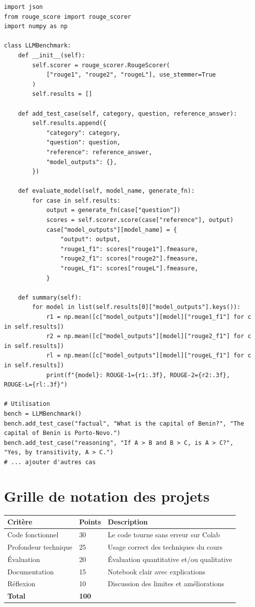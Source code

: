 \begin{verbatim}
import json
from rouge_score import rouge_scorer
import numpy as np

class LLMBenchmark:
    def __init__(self):
        self.scorer = rouge_scorer.RougeScorer(
            ["rouge1", "rouge2", "rougeL"], use_stemmer=True
        )
        self.results = []

    def add_test_case(self, category, question, reference_answer):
        self.results.append({
            "category": category,
            "question": question,
            "reference": reference_answer,
            "model_outputs": {},
        })

    def evaluate_model(self, model_name, generate_fn):
        for case in self.results:
            output = generate_fn(case["question"])
            scores = self.scorer.score(case["reference"], output)
            case["model_outputs"][model_name] = {
                "output": output,
                "rouge1_f1": scores["rouge1"].fmeasure,
                "rouge2_f1": scores["rouge2"].fmeasure,
                "rougeL_f1": scores["rougeL"].fmeasure,
            }

    def summary(self):
        for model in list(self.results[0]["model_outputs"].keys()):
            r1 = np.mean([c["model_outputs"][model]["rouge1_f1"] for c in self.results])
            r2 = np.mean([c["model_outputs"][model]["rouge2_f1"] for c in self.results])
            rl = np.mean([c["model_outputs"][model]["rougeL_f1"] for c in self.results])
            print(f"{model}: ROUGE-1={r1:.3f}, ROUGE-2={r2:.3f}, ROUGE-L={rl:.3f}")

# Utilisation
bench = LLMBenchmark()
bench.add_test_case("factual", "What is the capital of Benin?", "The capital of Benin is Porto-Novo.")
bench.add_test_case("reasoning", "If A > B and B > C, is A > C?", "Yes, by transitivity, A > C.")
# ... ajouter d'autres cas
\end{verbatim}

\section{Grille de notation des projets}

\begin{longtable}{p{4cm}p{2cm}p{6.5cm}}
\toprule
\textbf{Crit\`ere} & \textbf{Points} & \textbf{Description} \\
\midrule
Code fonctionnel & 30 & Le code tourne sans erreur sur Colab \\
Profondeur technique & 25 & Usage correct des techniques du cours \\
\'Evaluation & 20 & \'Evaluation quantitative et/ou qualitative \\
Documentation & 15 & Notebook clair avec explications \\
R\'eflexion & 10 & Discussion des limites et am\'eliorations \\
\midrule
\textbf{Total} & \textbf{100} & \\
\bottomrule
\end{longtable}

